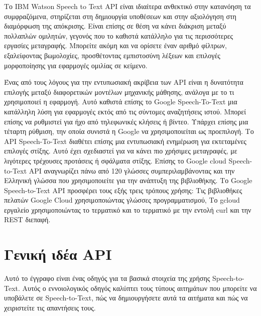 \documentclass[oneside, 12pt]{book}
\begin{document}
Το IBM Watson Speech to Text API είναι ιδιαίτερα ανθεκτικό στην κατανόηση τα συμφραζόμενα,
στηρίζεται στη δημιουργία υποθέσεων και στην αξιολόγηση στη διαμόρφωση της απόκρισης.
Είναι επίσης σε θέση να κάνει διάκριση μεταξύ πολλαπλών ομιλητών, γεγονός που το καθιστά κατάλληλο
για τις περισσότερες εργασίες μεταγραφής.
Μπορείτε ακόμη και να ορίσετε έναν αριθμό φίλτρων, εξαλείφοντας βωμολοχίες, προσθέτοντας εμπιστοσύνη
λέξεων και επιλογές μορφοποίησης για εφαρμογές ομιλίας σε κείμενο.

Ένας από τους λόγους για την εντυπωσιακή ακρίβεια των API είναι η δυνατότητα επιλογής μεταξύ
διαφορετικών μοντέλων μηχανικής μάθησης, ανάλογα με το τι χρησιμοποιεί η εφαρμογή.
Αυτό καθιστά επίσης το Google Speech-To-Text μια κατάλληλη λύση για εφαρμογές εκτός από τις σύντομες
αναζητήσεις ιστού.
Μπορεί επίσης να ρυθμιστεί για ήχο από τηλεφωνικές κλήσεις ή βίντεο.
Υπάρχει επίσης μια τέταρτη ρύθμιση, την οποία συνιστά η Google να χρησιμοποιείται ως προεπιλογή.
Το API Speech-To-Text διαθέτει επίσης μια εντυπωσιακή ενημέρωση για εκτεταμένες επιλογές στίξης.
Αυτό έχει σχεδιαστεί για να κάνει πιο χρήσιμες μεταγραφές, με λιγότερες τρέχουσες προτάσεις ή
σφάλματα στίξης.
Επίσης το Google cloud Speech-to-Text API αναγνωρίζει πάνω από 120 γλώσσες συμπεριλαμβάνοντας και
την Ελληνική γλώσσα που χρησιμοποιείτε για την ανάπτυξη της βιβλιοθήκης.
Το Google Speech-to-Text API προσφέρει τους εξής τρεις τρόπους χρήσης: Τις βιβλιοθήκες πελατών
Google Cloud χρησιμοποιώντας γλώσσες προγραμματισμού, Το gcloud εργαλείο χρησιμοποιώντας το τερματικό
και το τερματικό με την εντολή curl και την REST διεπαφή.

\chapter{Γενική ιδέα API}
\label{ch:γενική-ιδέα-api}
Αυτό το έγγραφο είναι ένας οδηγός για τα βασικά στοιχεία της χρήσης Speech-to-Text.
Αυτός ο εννοιολογικός οδηγός καλύπτει τους τύπους αιτημάτων που μπορείτε να υποβάλετε σε
Speech-to-Text, πώς να δημιουργήσετε αυτά τα αιτήματα και πώς να χειριστείτε τις απαντήσεις τους.
\end{document}
